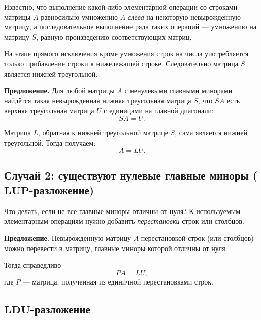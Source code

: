 \documentclass[11pt,a4paper]{article}
\begin{document}
Известно, что выполнение какой-либо элементарной операции со строками
матрицы \(A\) равносильно умножению \(A\) \emph{слева} на некоторую
невырожденную матрицу, а последовательное выполнение ряда таких операций
--- умножению на матрицу \(S\), равную произведению соответствующих
матриц.

На этапе прямого исключения кроме умножения строк на числа употребляется
только прибавление строки к нижележащей строке. Следовательно матрица
\(S\) является нижней треугольной.

\textbf{Предложение.} Для любой матрицы \(A\) с ненулевыми главными
минорами найдётся такая невырожденная нижняя треугольная матрица \(S\),
что \(SA\) есть верхняя треугольная матрица \(U\) с единицами на главной
диагонали: \[ SA = U. \]

Матрица \(L\), обратная к нижней треугольной матрице \(S\), сама
является нижней треугольной. Тогда получаем: \[ A = LU. \]

    \hypertarget{ux441ux43bux443ux447ux430ux439-2-ux441ux443ux449ux435ux441ux442ux432ux443ux44eux442-ux43dux435ux43dux443ux43bux435ux432ux44bux435-ux433ux43bux430ux432ux43dux44bux435-ux43cux438ux43dux43eux440ux44b-mathbflup-ux440ux430ux437ux43bux43eux436ux435ux43dux438ux435}{%
\subsection{\texorpdfstring{Случай 2: существуют нулевые главные
миноры
(\(\mathbf{LUP}\)-разложение)}{Случай 2: существуют нулевые главные миноры (\textbackslash mathbf\{LUP\}-разложение)}}\label{ux441ux43bux443ux447ux430ux439-2-ux441ux443ux449ux435ux441ux442ux432ux443ux44eux442-ux43dux435ux43dux443ux43bux435ux432ux44bux435-ux433ux43bux430ux432ux43dux44bux435-ux43cux438ux43dux43eux440ux44b-mathbflup-ux440ux430ux437ux43bux43eux436ux435ux43dux438ux435}}

Что делать, если не все главные миноры отличны от нуля? К используемым
элементарным операциям нужно добавить \emph{перестановки} строк или
столбцов.

\textbf{Предложение.} Невырожденную матрицу \(A\) перестановкой строк
(или столбцов) можно перевести в матрицу, главные миноры которой отличны
от нуля.

Тогда справедливо \[ PA = LU,\] где \(P\) --- матрица, полученная из
единичной перестановками строк.

    \hypertarget{mathbfldu-ux440ux430ux437ux43bux43eux436ux435ux43dux438ux435}{%
\subsection{\texorpdfstring{\(\mathbf{LDU}\)-разложение}{\textbackslash mathbf\{LDU\}-разложение}}\label{mathbfldu-ux440ux430ux437ux43bux43eux436ux435ux43dux438ux435}}
\end{document}
